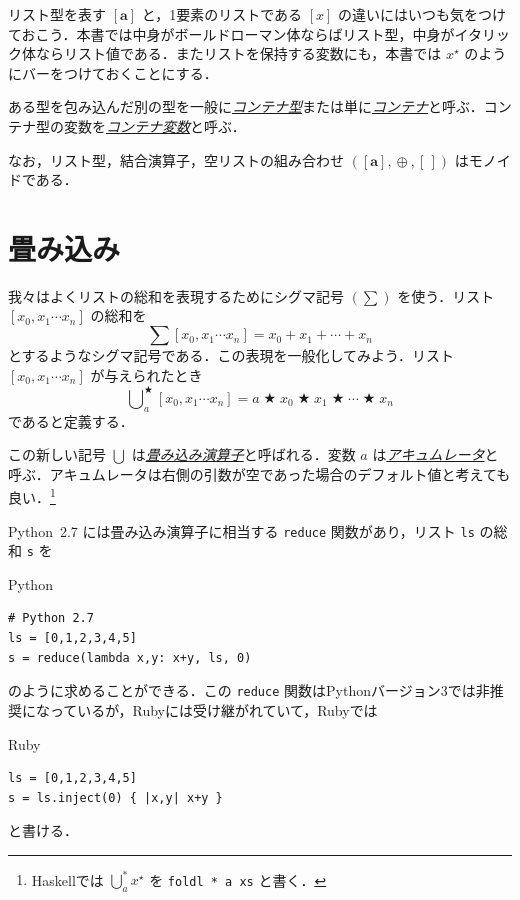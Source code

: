 \documentclass[a4paper]{jsbook}
\newcommand{\programminglanguage}[1]{\textsf{#1}}
\newcommand{\haskell}{\programminglanguage{Haskell}}
\newcommand{\python}{\programminglanguage{Python}}
\newcommand{\ruby}{\programminglanguage{Ruby}}
\newcommand{\keyword}[1]{{\underline{\emph{#1}}}}
\newcommand{\code}[1]{\texttt{#1}}
\newenvironment{pythoncode}{\begin{itembox}[r]{\python}}{\end{itembox}}
\newenvironment{rubycode}{\begin{itembox}[r]{\ruby}}{\end{itembox}}
\newcommand{\mListWith}[1]{\left[#1\right]}
\newcommand{\mTupleWith}[1]{\left(#1\right)}
\newcommand{\mType}[1]{\mathbf{#1}}
\newcommand{\mListType}[1]{\mListWith{\mType{#1}}}
\newcommand{\mEmptyList}{{[\,]}}
\newcommand{\mList}[1]{{#1}^\mathrm{\star}}
\DeclareMathOperator{\mBinOp}{\bigstar}
\DeclareMathOperator*{\mFold}{\bigcup}
\DeclareMathOperator{\mAppend}{\oplus}
\begin{document}
リスト型を表す $\mListType{a}$ と，1要素のリストである $\mListWith{x}$ の違いにはいつも気をつけておこう．本書では中身がボールドローマン体ならばリスト型，中身がイタリック体ならリスト値である．またリストを保持する変数にも，本書では $\mList{x}$ のようにバーをつけておくことにする．

ある型を包み込んだ別の型を一般に\keyword{コンテナ型}または単に\keyword{コンテナ}と呼ぶ．コンテナ型の変数を\keyword{コンテナ変数}と呼ぶ．

なお，リスト型，結合演算子，空リストの組み合わせ $\mTupleWith{\mListType{a},\mAppend,\mEmptyList}$ はモノイドである．

\section{畳み込み}

我々はよくリストの総和を表現するためにシグマ記号 $(\sum)$ を使う．リスト $\mListWith{x_0,x_1\dotsb x_n}$ の総和を
\begin{equation}
\sum\mListWith{x_0,x_1\dotsb x_n}=x_0+x_1+\dotsb+x_n
\end{equation}
とするようなシグマ記号である．この表現を一般化してみよう．リスト $\mListWith{x_0,x_1\dotsb x_n}$ が与えられたとき
\begin{equation}
\mFold^{\mBinOp}_a\mListWith{x_0,x_1\dotsb x_n}
=a\mBinOp x_0\mBinOp x_1\mBinOp\dotsb\mBinOp x_n
\end{equation}
であると定義する．

この新しい記号 $\mFold$ は\keyword{畳み込み演算子}と呼ばれる．変数 $a$ は\keyword{アキュムレータ}と呼ぶ．アキュムレータは右側の引数が空であった場合のデフォルト値と考えても良い．\footnote{\haskell では $\mFold^*_a\mList{x}$ を \code{foldl * a xs} と書く．}

\python\ 2.7 には畳み込み演算子に相当する \code{reduce} 関数があり，リスト \code{ls} の総和 \code{s} を
\begin{pythoncode}
\begin{verbatim}
# Python 2.7
ls = [0,1,2,3,4,5]
s = reduce(lambda x,y: x+y, ls, 0)
\end{verbatim}
\end{pythoncode}
のように求めることができる．この \code{reduce} 関数は\python バージョン3では非推奨になっているが，\ruby には受け継がれていて，\ruby では
\begin{rubycode}
\begin{verbatim}
ls = [0,1,2,3,4,5]
s = ls.inject(0) { |x,y| x+y }
\end{verbatim}
\end{rubycode}
と書ける．
\end{document}
